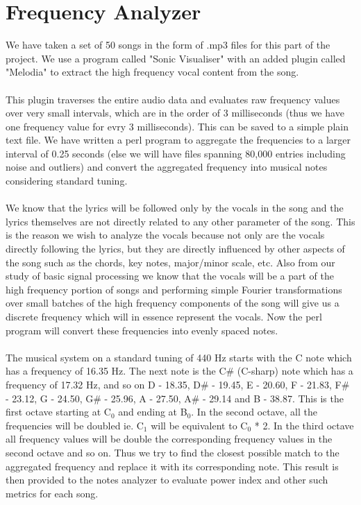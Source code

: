 \documentclass[letterpaper, 11pt]{article}
\begin{document}
\section*{Frequency Analyzer}
We have taken a set of 50 songs in the form of .mp3 files for this part of the project. We use a program called "Sonic Visualiser" with an added plugin called "Melodia" to extract the high frequency vocal content from the song. \\\\ This plugin traverses the entire audio data and evaluates raw frequency values over very small intervals, which are in the order of 3 milliseconds (thus we have one frequency value for evry 3 milliseconds). This can be saved to a simple plain text file. We have written a perl program to aggregate the frequencies to a larger interval of 0.25 seconds (else we will have files spanning 80,000 entries including noise and outliers) and convert the aggregated frequency into musical notes considering standard tuning.\\\\We know that the lyrics will be followed only by the vocals in the song and the lyrics themselves are not directly related to any other parameter of the song. This is the reason we wish to analyze the vocals because not only are the vocals directly following the lyrics, but they are directly influenced by other aspects of the song such as the chords, key notes, major/minor scale, etc. Also from our study of basic signal processing we know that the vocals will be a part of the high frequency portion of songs and performing simple Fourier transformations over small batches of the high frequency components of the song will give us a discrete frequency which will in essence represent the vocals. Now the perl program will convert these frequencies into evenly spaced notes.\\\\The musical system on a standard tuning of 440 Hz starts with the C note which has a frequency of 16.35 Hz. The next note is the C\# (C-sharp) note which has a frequency of 17.32 Hz, and so on D - 18.35, D\# - 19.45, E - 20.60, F - 21.83, F\# - 23.12, G - 24.50, G\# - 25.96, A - 27.50, A\# - 29.14 and B - 38.87. This is the first octave starting at C$_0$ and ending at B$_0$. In the second octave, all the frequencies will be doubled ie. C$_1$ will be equivalent to C$_0$ * 2. In the third octave all frequency values will be double the corresponding frequency values in the second octave and so on. Thus we try to find the closest possible match to the aggregated frequency and replace it with its corresponding note. This result is then provided to the notes analyzer to evaluate power index and other such metrics for each song.
\end{document}
